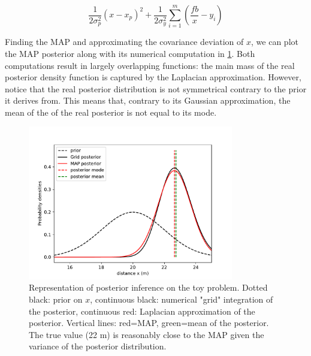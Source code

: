\begin{equation}
    \frac{1}{2 \sigma_p^2}(x - x_p)^2 + \frac{1}{2\sigma_y^2} \sum_{i=1}^m (\frac{fb}{x} - y_i)
\end{equation}

Finding the MAP and approximating the covariance deviation of $x$, we can plot the MAP posterior along with its numerical computation in \ref{fig:MAP_stereo1D}. 
Both computations result in largely overlapping functions: the main mass of the real posterior density function is captured by the Laplacian approximation.
However, notice that the real posterior distribution is not symmetrical contrary to the prior it derives from. This means that, contrary to its Gaussian approximation, the mean of the
of the real posterior is not equal to its mode. 

\begin{figure}[h]
    \centering
    \includegraphics[width=0.8\textwidth]{figures/MAP_stereo1D.pdf}
    \caption{Representation of posterior inference on the toy problem. Dotted black: prior on $x$, 
    continuous black: numerical "grid" integration of the posterior, continuous red: Laplacian approximation of the posterior. 
    Vertical lines: red=MAP, green=mean of the posterior. The true value (22 m) is reasonably close to the MAP given the variance 
    of the posterior distribution.
    }
    \label{fig:MAP_stereo1D}
 \end{figure}




